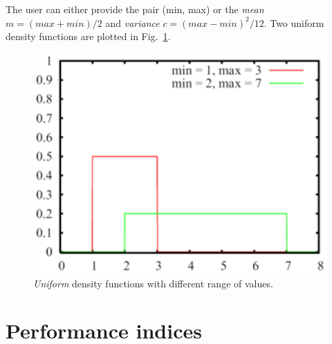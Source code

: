 The user can either provide the pair (min, max) or the \emph{mean}
$m=(max+min)/2$ and \emph{variance} $c=(max-min)^2 / 12$. Two
uniform density functions are plotted in Fig.~\ref{fig:famUnif}.
\begin{figure}[htb]
    \begin{center}
        \includegraphics[scale=.5]{img/jsimg/4.13.eps}
    \end{center}
    \caption{\emph{Uniform} density functions with different range of values.}
    \label{fig:famUnif}
\end{figure}

\section{Performance indices}
\label{perfinde}

